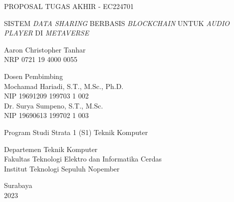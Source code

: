 \begin{large}
  PROPOSAL TUGAS AKHIR - EC224701
\end{large}

\vspace{\fill}

\begin{spacing}{1.5}
  \begin{Large}
    SISTEM \emph{DATA SHARING} BERBASIS \emph{BLOCKCHAIN} UNTUK \emph{AUDIO PLAYER}
    DI \emph{METAVERSE}
  \end{Large}
\end{spacing}

\vspace{\fill}

\begin{large}
  Aaron Christopher Tanhar \\
  \textmd{NRP 0721 19 4000 0055}
\end{large}

\vspace{\fill}

\begin{large}
  \textmd{Dosen Pembimbing} \\
  Mochamad Hariadi, S.T., M.Sc., Ph.D. \\
  \textmd{NIP 19691209 199703 1 002} \\
  Dr. Surya Sumpeno, S.T., M.Sc. \\
  \textmd{NIP 19690613 199702 1 003}
\end{large}

\vspace{\fill}

Program Studi Strata 1 (S1) Teknik Komputer \\

\mdseries

Departemen Teknik Komputer \\
Fakultas Teknologi Elektro dan Informatika Cerdas \\
Institut Teknologi Sepuluh Nopember

Surabaya \\
2023

